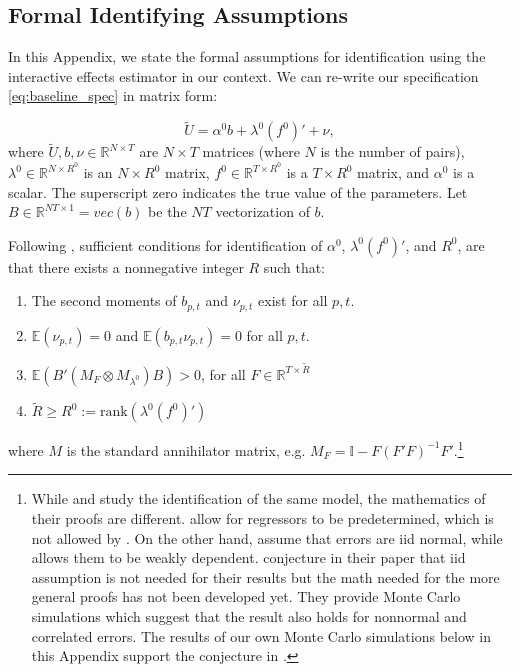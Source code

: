 \documentclass[12pt]{article}
\newcommand{\1}{\mathbf{1}}
\begin{document}
\begin{appendix}
\subsection{Formal Identifying Assumptions}
\label{app:moon}
In this Appendix, we state the formal assumptions for identification using the interactive effects estimator in our context. We can re-write our specification \ref{eq:baseline_spec} in matrix form:

\begin{equation*}
\tilde{U} =  \alpha^0 b +\lambda^0 (f^0)'+ \nu, 
\end{equation*}
where $\tilde{U}, b, \nu \in\mathbb{R}^{N\times T}$ are $N\times T$ matrices (where $N$ is the number of pairs), $\lambda^0 \in\mathbb{R}^{N\times R^0}$ is an $N\times R^0$ matrix, $f^0 \in\mathbb{R}^{T\times R^0}$ is a $T\times R^0$ matrix, and $\alpha^0$ is a scalar. The superscript zero indicates the true value of the parameters. Let $B \in\mathbb{R}^{NT\times 1}=vec(b)$ be the $NT$ vectorization of  $b$.

Following \cite{moon2015linear}, sufficient conditions for identification of $\alpha^0$, $\lambda^0 (f^0)'$, and $R^0$, are that there exists a nonnegative integer $R$ such that:
\begin{enumerate}
\item The second moments of $b_{p,t}$ and $\nu_{p,t}$ exist for all $p,t$.
\item $\mathbb{E}(\nu_{p,t})=0$ and $\mathbb{E}(b_{p,t}\nu_{p,t})=0$ for all $p,t$.
\item $\mathbb{E}\left(B'\left(M_F\otimes M_{\lambda^0} \right)B\right)>0$, for all $F\in\mathbb{R}^{T\times \tilde{R}}$
\item $\tilde{R}\geq R^0:=\textrm{rank}(\lambda^0 (f^0)')$ 
\end{enumerate}
where $M$ is the standard annihilator matrix, e.g. $M_F=\mathbb{I}-F(F'F)^{-1}F'$.\footnote{While \cite{moon2015linear} and \cite{bai:09} study the identification of the same model, the mathematics of their proofs are different.  \cite{moon2015linear} allow for regressors to be predetermined, which is not allowed by \cite{bai:09}. On the other hand, \cite{moon2015linear} assume that errors are iid normal, while \cite{bai:09} allows them to be weakly dependent. \cite{moon2015linear} conjecture in their paper that iid assumption is not needed for their results but the math needed for the more general proofs has not been developed yet. They provide Monte Carlo simulations which suggest that the result also holds for nonnormal and correlated errors. The results of our own Monte Carlo simulations below in this Appendix support the conjecture in \cite{moon2015linear}. }


\end{appendix}
\end{document}
